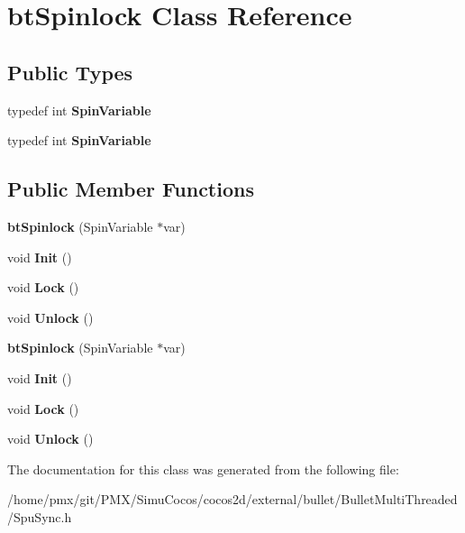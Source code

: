 \hypertarget{classbtSpinlock}{}\section{bt\+Spinlock Class Reference}
\label{classbtSpinlock}
\subsection*{Public Types}
\begin{DoxyCompactItemize}
\item 
\mbox{\label{classbtSpinlock_afaa3c962dd67a0e6ab713fc6f1df0a36}} 
typedef int {\bfseries Spin\+Variable}
\item 
\mbox{\label{classbtSpinlock_afaa3c962dd67a0e6ab713fc6f1df0a36}} 
typedef int {\bfseries Spin\+Variable}
\end{DoxyCompactItemize}
\subsection*{Public Member Functions}
\begin{DoxyCompactItemize}
\item 
\mbox{\label{classbtSpinlock_a2248925eeb85d51a353b99af2f410c99}} 
{\bfseries bt\+Spinlock} (Spin\+Variable $\ast$var)
\item 
\mbox{\label{classbtSpinlock_af7cda5ac60df4e98cc1572a9333e9f46}} 
void {\bfseries Init} ()
\item 
\mbox{\label{classbtSpinlock_ae3b7b9127f93474665fb1b67f11cab41}} 
void {\bfseries Lock} ()
\item 
\mbox{\label{classbtSpinlock_a0d25638d58c7fac3cd768098f7c69ab9}} 
void {\bfseries Unlock} ()
\item 
\mbox{\label{classbtSpinlock_a2248925eeb85d51a353b99af2f410c99}} 
{\bfseries bt\+Spinlock} (Spin\+Variable $\ast$var)
\item 
\mbox{\label{classbtSpinlock_af7cda5ac60df4e98cc1572a9333e9f46}} 
void {\bfseries Init} ()
\item 
\mbox{\label{classbtSpinlock_ae3b7b9127f93474665fb1b67f11cab41}} 
void {\bfseries Lock} ()
\item 
\mbox{\label{classbtSpinlock_a0d25638d58c7fac3cd768098f7c69ab9}} 
void {\bfseries Unlock} ()
\end{DoxyCompactItemize}


The documentation for this class was generated from the following file\+:\begin{DoxyCompactItemize}
\item 
/home/pmx/git/\+P\+M\+X/\+Simu\+Cocos/cocos2d/external/bullet/\+Bullet\+Multi\+Threaded/Spu\+Sync.\+h\end{DoxyCompactItemize}

